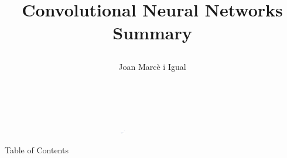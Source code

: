 \documentclass[xcolor={x11names, table}, compress]{beamer}
\begin{document}
  { 
      \begin{frame}
          \vspace{-1.5cm}
          \hfill{}
          \begin{flushleft}
              \hspace{-1cm}\includegraphics[width=0.8\textwidth, height=0.4em]{title_line.pdf}\hfill
              
              \title{
                  \begin{flushleft}{\huge \color{BHKpresentationDark} 
                  Convolutional Neural Networks Summary
              } 
              \end{flushleft}}
              
              \date{$~~$}
              \author[Joan]{\begin{flushleft}\vspace{-1cm} Joan Marcè i Igual\end{flushleft}}
              \titlepage
          \end{flushleft}
      \end{frame}
  }
  
  \begin{frame}{Table of Contents}
    \tableofcontents
  \end{frame}
  
   
  
  
  
  
\end{document}
